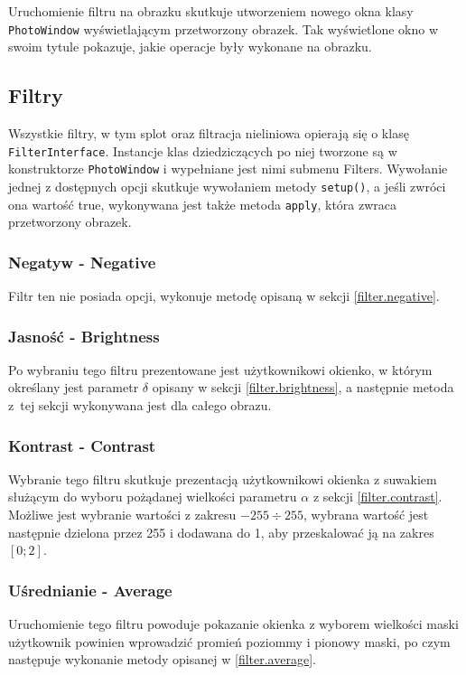 \documentclass{classrep}
\begin{document}
Uruchomienie filtru na obrazku skutkuje utworzeniem nowego okna klasy \texttt{PhotoWindow} wyświetlającym przetworzony obrazek. Tak wyświetlone okno w swoim tytule pokazuje, jakie operacje były wykonane na obrazku.

\subsection{Filtry}
Wszystkie filtry, w tym splot oraz filtracja nieliniowa opierają się o klasę \texttt{FilterInterface}. Instancje klas dziedziczących po niej tworzone są w konstruktorze \texttt{PhotoWindow} i wypełniane jest nimi submenu Filters. Wywołanie jednej z dostępnych opcji skutkuje wywołaniem metody \texttt{setup()}, a jeśli zwróci ona wartość true, wykonywana jest także metoda \texttt{apply}, która zwraca przetworzony obrazek.

\subsubsection{Negatyw - Negative}
Filtr ten nie posiada opcji, wykonuje metodę opisaną w sekcji \ref{filter.negative}.

\subsubsection{Jasność - Brightness}
Po wybraniu tego filtru prezentowane jest użytkownikowi okienko, w którym określany jest parametr $\delta$ opisany w sekcji \ref{filter.brightness}, a następnie metoda z~tej sekcji wykonywana jest dla całego obrazu.

\subsubsection{Kontrast - Contrast}
Wybranie tego filtru skutkuje prezentacją użytkownikowi okienka z suwakiem służącym do wyboru pożądanej wielkości parametru $\alpha$ z sekcji \ref{filter.contrast}. Możliwe jest wybranie wartości z zakresu $-255 \div 255$, wybrana wartość jest następnie dzielona przez 255 i dodawana do 1, aby przeskalować ją na zakres $[0; 2]$.

\subsubsection{Uśrednianie - Average}
Uruchomienie tego filtru powoduje pokazanie okienka z wyborem wielkości maski \ppauza użytkownik powinien wprowadzić promień poziommy i pionowy maski, po czym następuje wykonanie metody opisanej w \ref{filter.average}.
\end{document}
